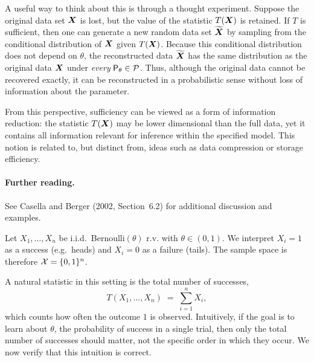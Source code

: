 A useful way to think about this is through a thought experiment.
Suppose the original data set $\boldsymbol{X}$ is lost, but the value of the statistic $T(\boldsymbol{X})$
is retained.
If $T$ is sufficient, then one can generate a new random data set
$\widetilde{\boldsymbol{X}}$ by sampling from the conditional distribution of $\boldsymbol{X}$
given $T(\boldsymbol{X})$.
Because this conditional distribution does not depend on $\theta$,
the reconstructed data $\widetilde{\boldsymbol{X}}$ has the same distribution as the original data $\boldsymbol{X}$
under \emph{every} $\mathsf{P}_{\theta} \in \mathcal{P}$.
Thus, although the original data cannot be recovered exactly,
it can be reconstructed in a probabilistic sense without loss of information
about the parameter.

From this perspective, sufficiency can be viewed as a form of information reduction:
the statistic $T(\boldsymbol{X})$ may be lower dimensional than the full data,
yet it contains all information relevant for inference within the specified model.
This notion is related to, but distinct from, ideas such as data compression or storage efficiency.


\paragraph{Further reading.}
See Casella and Berger (2002, Section~6.2) for additional discussion and examples.

\begin{ex}
    \label{ex:ch3_bd}
Let $X_1,\dots,X_n$ be i.i.d.\ Bernoulli$(\theta)$ r.v. with $\theta \in (0,1)$.
We interpret $X_i=1$ as a success (e.g.\ heads) and $X_i=0$ as a failure (tails).
The sample space is therefore $\mathcal{X} = \{0,1\}^n$.

A natural statistic in this setting is the total number of successes,
\[
T(X_1,\dots,X_n) \;=\; \sum_{i=1}^n X_i,
\]
which counts how often the outcome $1$ is observed.
Intuitively, if the goal is to learn about $\theta$, the probability of success in a single trial,
then only the total number of successes should matter, not the specific order in which they occur.
We now verify that this intuition is correct.
\end{ex}

